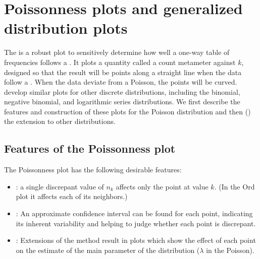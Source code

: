 \documentclass[11pt]{book}
\begin{document}


\section{Poissonness plots and generalized distribution plots}\label{sec:discrete-Poissonness}


The 
\citep{Hoaglin:80}
is a robust plot to sensitively determine how well a 
one-way table of frequencies follows a .
It plots a quantity called a count metameter
against \(k\), designed
so that the result will be points along a
straight line when the data follow a .  When the
data deviate from a Poisson, the points will be curved.
\citet{HoaglinTukey:85}
develop similar plots for other discrete distributions,
including the binomial, negative binomial, and logarithmic series
distributions.  We first describe the features and construction
of these plots for the Poisson distribution and then ()
the extension to other distributions.



\subsection{Features of the Poissonness plot}
The Poissonness plot has the following desirable features:
\begin{itemize}
\item {}: a single discrepant value of \(n_k\)
       affects only the point at value \(k\).  (In the Ord plot
       it affects each of its neighbors.)
\item {}:  An approximate confidence
       interval can be found for each point, indicating its inherent
       variability and helping to judge whether each point is
       discrepant.
\item {}:  Extensions of the method result in
       plots which show the effect of each point on the estimate of
       the main parameter of the distribution (\(\lambda\) in the
       Poisson).
\end{itemize}
\end{document}
